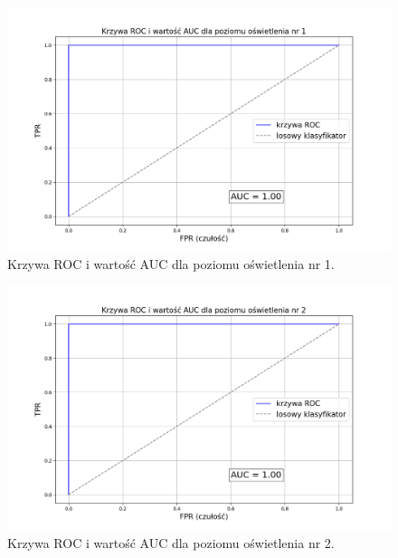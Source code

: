 \begin{figure}[H]
    \centering
    \includegraphics[width=\linewidth]{r_test_dokładności/AUC_charts/1.png}
    \caption{Krzywa ROC i wartość AUC dla poziomu oświetlenia nr 1.}
    \label{fig:ROC-1}
\end{figure}

\begin{figure}[H]
    \centering
    \includegraphics[width=\linewidth]{r_test_dokładności/AUC_charts/2.png}
    \caption{Krzywa ROC i wartość AUC dla poziomu oświetlenia nr 2.}
    \label{fig:ROC-2}
\end{figure}

